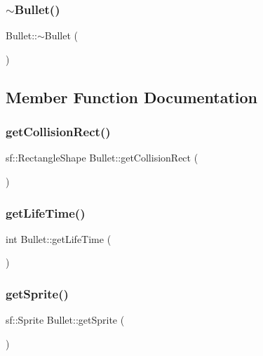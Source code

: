 \mbox{\label{class_bullet_aaeb5cb41d7db89f49007b08b41f1bfcf}} 
\subsubsection{\texorpdfstring{$\sim$\+Bullet()}{~Bullet()}}
{\footnotesize\ttfamily Bullet\+::$\sim$\+Bullet (\begin{DoxyParamCaption}{ }\end{DoxyParamCaption})}



\subsection{Member Function Documentation}
\mbox{\label{class_bullet_afa5ea4cb422dad6a578071ee86494a28}} 
\subsubsection{\texorpdfstring{get\+Collision\+Rect()}{getCollisionRect()}}
{\footnotesize\ttfamily sf\+::\+Rectangle\+Shape Bullet\+::get\+Collision\+Rect (\begin{DoxyParamCaption}{ }\end{DoxyParamCaption})}

\mbox{\label{class_bullet_a974be9eb4bd0cba53f578c7160fe2f87}} 
\subsubsection{\texorpdfstring{get\+Life\+Time()}{getLifeTime()}}
{\footnotesize\ttfamily int Bullet\+::get\+Life\+Time (\begin{DoxyParamCaption}{ }\end{DoxyParamCaption})}

\mbox{\label{class_bullet_aa313bc0e2c9fd200c526cb6fe320462c}} 
\subsubsection{\texorpdfstring{get\+Sprite()}{getSprite()}}
{\footnotesize\ttfamily sf\+::\+Sprite Bullet\+::get\+Sprite (\begin{DoxyParamCaption}{ }\end{DoxyParamCaption})}

